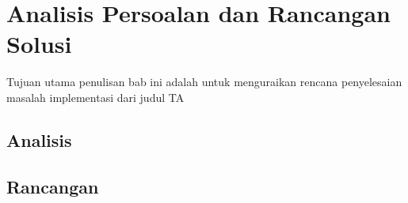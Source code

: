 \chapter{Analisis Persoalan dan Rancangan Solusi}

Tujuan utama penulisan bab ini adalah untuk menguraikan rencana penyelesaian masalah implementasi dari judul TA

\section{Analisis}
\blindtext

\section{Rancangan}
\blindtext